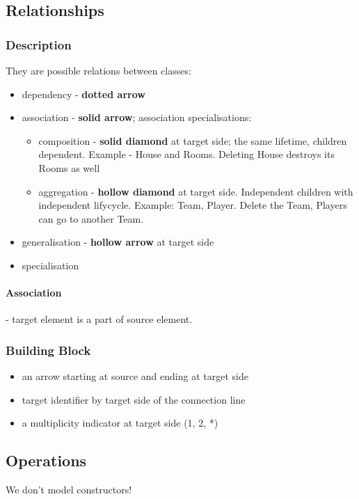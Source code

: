 \documentclass{report}
\begin{document}
\subsection{Relationships}

\subsubsection{Description} 
They are possible relations between classes:
\begin{itemize}
	\item dependency - \textbf{dotted arrow}
	\item association - \textbf{solid arrow}; association specialisations:
	\begin{itemize}
		\item composition - \textbf{solid diamond} at target side; the same lifetime, 
		children dependent. Example - House and Rooms. Deleting House destroys its
		Rooms as well
		\item aggregation - \textbf{hollow diamond} at target side. Independent children
		with independent lifycycle. Example: Team, Player. Delete the Team, Players can go
		to another Team.
	\end{itemize}
	\item generalisation - \textbf{hollow arrow} at target side
	\item specialisation
\end{itemize}

\paragraph{Association} - target element is a part of source element.

\subsubsection{Building Block}
\begin{itemize}
  \item an arrow starting at source and ending at target side
  \item target identifier by target side of the connection line
  \item a multiplicity indicator at target side (1, 2, *)
\end{itemize}

\subsection{Operations}
We don't model constructors!
\end{document}
